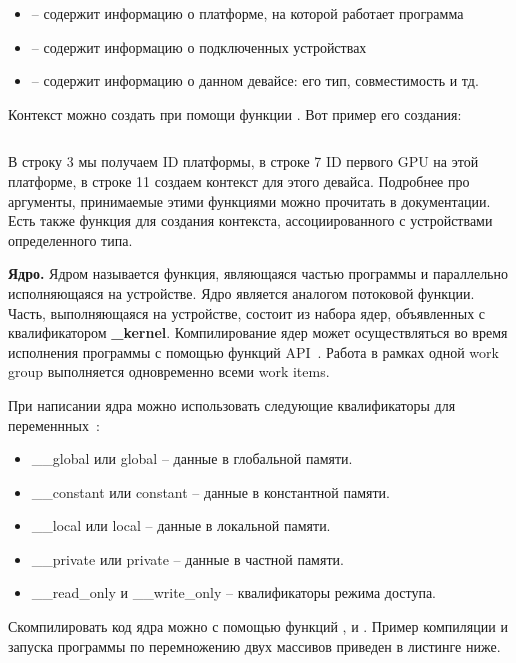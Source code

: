 \begin{itemize}
    \item{} -- содержит информацию о платформе, на которой работает программа
    \item{} -- содержит информацию о подключенных устройствах
    \item{} -- содержит информацию о данном девайсе: его тип, совместимость и тд.
\end{itemize}

Контекст можно создать при помощи функции . Вот пример его создания:

\inputminted{c++}{listings/OpenCLContextExample.c}

В строку 3 мы получаем ID платформы, в строке 7 ID первого GPU на этой платформе, в строке 11 создаем контекст для этого девайса. Подробнее про аргументы, принимаемые этими функциями можно прочитать в документации. Есть также функция  для создания контекста, ассоциированного с устройствами определенного типа.

\textbf{Ядро.} Ядром называется функция, являющаяся частью программы и параллельно исполняющаяся на устройстве. Ядро является аналогом потоковой функции. Часть, выполняющаяся на устройстве, состоит из набора ядер, объявленных с квалификатором \textbf{\_kernel}. Компилирование ядер может осуществляться во время исполнения программы с помощью функций API~\cite{Bastrakov2011}. Работа в рамках одной work group выполняется одновременно всеми work items.

При написании ядра можно использовать следующие квалификаторы для переменнных~\cite{GorshkovBastrakov2012}:

\begin{itemize}
    \item\_\_global или global -- данные в глобальной памяти.
    \item\_\_constant или constant -- данные в константной памяти.
    \item\_\_local или local -- данные в локальной памяти.
    \item\_\_private или private -- данные в частной памяти.
    \item\_\_read\_only и \_\_write\_only -- квалификаторы режима доступа.
\end{itemize}

\sloppy
Скомпилировать код ядра можно с помощью функций ,  и . Пример компиляции и запуска программы по перемножению двух массивов приведен в листинге ниже.

